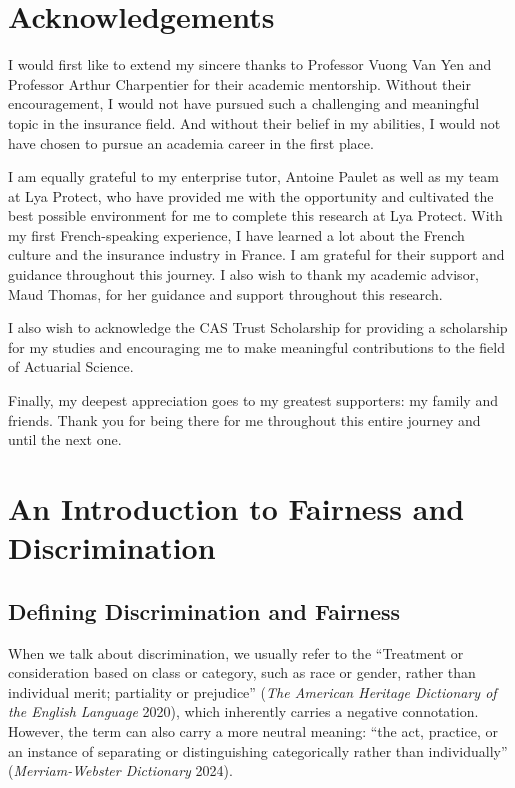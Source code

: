 \documentclass[
  a4paper,
  11pt,
  a4paper,
  twoside,
  openright]{report}
\begin{document}
\chapter*{Acknowledgements}\label{acknowledgements}


I would first like to extend my sincere thanks to Professor Vuong Van
Yen and Professor Arthur Charpentier for their academic mentorship.
Without their encouragement, I would not have pursued such a challenging
and meaningful topic in the insurance field. And without their belief in
my abilities, I would not have chosen to pursue an academia career in
the first place.

I am equally grateful to my enterprise tutor, Antoine Paulet as well as
my team at Lya Protect, who have provided me with the opportunity and
cultivated the best possible environment for me to complete this
research at Lya Protect. With my first French-speaking experience, I
have learned a lot about the French culture and the insurance industry
in France. I am grateful for their support and guidance throughout this
journey. I also wish to thank my academic advisor, Maud Thomas, for her
guidance and support throughout this research.

I also wish to acknowledge the CAS Trust Scholarship for providing a
scholarship for my studies and encouraging me to make meaningful
contributions to the field of Actuarial Science.

Finally, my deepest appreciation goes to my greatest supporters: my
family and friends. Thank you for being there for me throughout this
entire journey and until the next one.


\chapter{An Introduction to Fairness and
Discrimination}\label{an-introduction-to-fairness-and-discrimination}

\section{Defining Discrimination and
Fairness}\label{defining-discrimination-and-fairness}

When we talk about discrimination, we usually refer to the ``Treatment
or consideration based on class or category, such as race or gender,
rather than individual merit; partiality or prejudice'' (\emph{The
American Heritage Dictionary of the English Language} 2020), which
inherently carries a negative connotation. However, the term can also
carry a more neutral meaning: ``the act, practice, or an instance of
separating or distinguishing categorically rather than individually''
(\emph{Merriam-Webster Dictionary} 2024).
\end{document}
